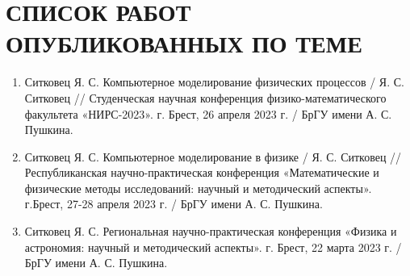 \chapter*{СПИСОК РАБОТ ОПУБЛИКОВАННЫХ ПО ТЕМЕ}
\label{ch:publish}

\begin{enumerate}
    \item Ситковец Я. С. Компьютерное моделирование физических процессов / Я. С. Ситковец // Студенческая научная конференция физико-математического факультета  «НИРС-2023». г. Брест, 26 апреля 2023 г. / БрГУ имени А. С. Пушкина.
    \item Ситковец Я. С. Компьютерное моделирование в физике / Я. С. Ситковец // Республиканская научно-практическая конференция «Математические и физические методы исследований: научный и методический аспекты». г.Брест, 27-28 апреля 2023 г. / БрГУ имени А. С. Пушкина.
    \item  Ситковец Я. С. Региональная научно-практическая конференция  «Физика и астрономия: научный и методический аспекты». г. Брест, 22 марта 2023 г. / БрГУ имени А. С. Пушкина.
\end{enumerate}